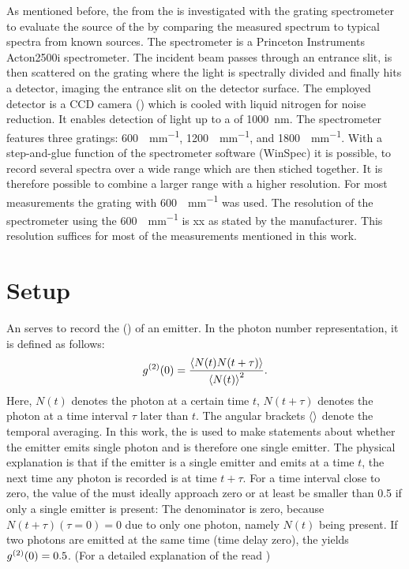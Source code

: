 		As mentioned before, the \fl from the \sivs is investigated with the grating spectrometer to evaluate the source of the \fl by comparing the measured spectrum to typical spectra from known sources.
		The spectrometer is a Princeton Instruments Acton2500i  spectrometer.
		The incident beam passes through an entrance slit, is then scattered on the grating where the light is spectrally divided and finally hits a detector, imaging the entrance slit on the detector surface.
		The employed detector is a CCD camera () which is cooled with liquid nitrogen for noise reduction.
		It enables detection of light up to a \wl of \SI{1000}{nm}.
		The spectrometer features three gratings: \SI[per-mode=symbol]{600}{\lines\per\mm}, \SI[per-mode=symbol]{1200}{\lines\per\mm}, and \SI[per-mode=symbol]{1800}{\lines\per\mm}.
		With a step-and-glue function of the spectrometer software (WinSpec) it is possible, to record several spectra over a wide \wl range which are then stiched together.
		It is therefore possible to combine a larger \wl range with a higher resolution.
		For most measurements the grating with \SI[per-mode=symbol]{600}{\lines\per\mm} was used. 
		The resolution of the spectrometer using the \SI{600}{\lines\per\mm} is xx as stated by the manufacturer.
		This resolution suffices for most of the measurements mentioned in this work.

	\section[HBT]{\HBT Setup}\label{sec::methods_hbt}

		An  serves to record the  () of an emitter.
		In the photon number representation, it is defined as follows:
		\[
		g^{(2)}(0) = \frac{ \left\langle  N(t) N(t+\tau) \right\rangle }{\left\langle N(t)\right\rangle^2}.
		\]
		Here, $N(t)$ denotes the photon at a certain time $t$, $N(t+\tau)$ denotes the photon at a time interval $\tau$ later than $t$.
		The angular brackets $\left\langle \right\rangle$ denote the temporal averaging.
		In this work, the \gtf is used to make statements about whether the emitter emits single photon and is therefore one single emitter.
		The physical explanation is  that if the emitter is a single emitter and emits at a time $t$, the next time any photon is recorded is at time $t+\tau$.
		For a time interval close to zero, the value of the \gtf must ideally approach zero or at least be smaller than \num{0.5} if only a single emitter is present:
		The denominator is zero, because $N(t + \tau) (\tau = 0)=0$ due to only one photon, namely $N(t)$ being present.
		If two photons are emitted at the same time (time delay zero), the \gtf yields $g^{(2)}(0)=0.5$. 
		(For a detailed explanation of the \gtf read \cite{fox})

